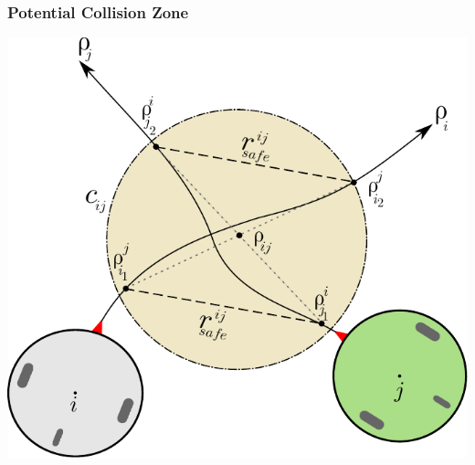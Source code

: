 
	\begin{frame}
		\frametitle{Potential Collision Zone}
		\centering
		\includegraphics[scale=0.6]{pictures/robots_pot_coll.pdf}
	\end{frame}

